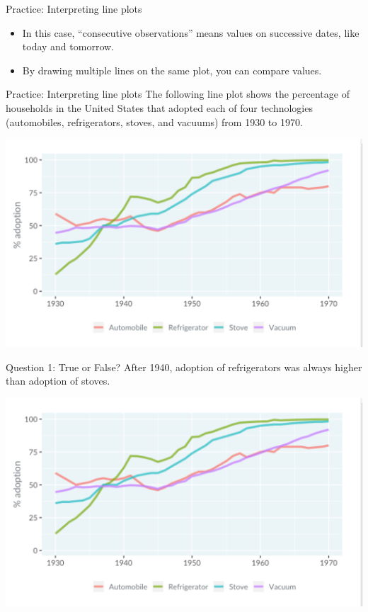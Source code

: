 \documentclass[
  ignorenonframetext,
]{beamer}
\begin{document}
\begin{frame}{Practice: Interpreting line plots}
\label{practice-interpreting-line-plots-1}
\begin{itemize}
\item
  In this case, ``consecutive observations'' means values on successive
  dates, like today and tomorrow.
\item
  By drawing multiple lines on the same plot, you can compare values.
\end{itemize}
\end{frame}

\begin{frame}{Practice: Interpreting line plots}
\label{practice-interpreting-line-plots-2}
The following line plot shows the percentage of households in the United
States that adopted each of four technologies (automobiles,
refrigerators, stoves, and vacuums) from 1930 to 1970.

\includegraphics{../images/im48.png}
\end{frame}

\begin{frame}{Question 1: True or False?}
\label{question-1-true-or-false-1}
After 1940, adoption of refrigerators was always higher than adoption of
stoves.

\includegraphics{../images/im48.png}
\end{frame}
\end{document}
